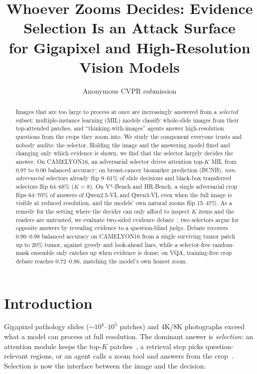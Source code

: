 \documentclass[10pt,twocolumn,letterpaper]{article}
\title{Whoever Zooms Decides: Evidence Selection Is an Attack Surface\\for Gigapixel and High-Resolution Vision Models}
\author{Anonymous CVPR submission}
\date{}
\begin{document}
\maketitle

\begin{abstract}
Images that are too large to process at once are increasingly answered from a \emph{selected} subset: multiple-instance learning (MIL) models classify whole-slide images from their top-attended patches, and ``thinking-with-images'' agents answer high-resolution questions from the crops they zoom into.
We study the component everyone trusts and nobody audits: the selector.
Holding the image and the answering model fixed and changing only which evidence is shown, we find that the selector largely decides the answer.
On CAMELYON16, an adversarial selector drives attention top-$K$ MIL from 0.97 to 0.00 balanced accuracy; on breast-cancer biomarker prediction (BCNB), \emph{non-adversarial} selectors already flip 9--61\% of slide decisions and black-box transferred selectors flip 64--68\% ($K{=}8$).
On V*-Bench and HR-Bench, a single adversarial crop flips 64--70\% of answers of Qwen2.5-VL and Qwen3-VL even when the full image is visible at reduced resolution, and the models' own natural zooms flip 15--47\%.
As a remedy for the setting where the decider can only afford to inspect $K$ items and the readers are untrusted, we evaluate two-sided evidence debate~\cite{irving2018debate}: two selectors argue for opposite answers by revealing evidence to a question-blind judge.
Debate recovers 0.90--0.98 balanced accuracy on CAMELYON16 from a single surviving tumor patch up to 20\% tumor, against greedy and look-ahead liars, while a selector-free random-mask ensemble only catches up when evidence is dense; on VQA, training-free crop debate reaches 0.72--0.86, matching the model's own honest zoom.
\end{abstract}

\section{Introduction}
Gigapixel pathology slides ($\sim\!10^4$--$10^5$ patches) and 4K/8K photographs exceed what a model can process at full resolution. The dominant answer is \emph{selection}: an attention module keeps the top-$K$ patches~\cite{ilse2018abmil}, a retrieval step picks question-relevant regions, or an agent calls a zoom tool and answers from the crop~\cite{wu2024vstar,zheng2025deepeyes}. Selection is now the interface between the image and the decision.
\end{document}
